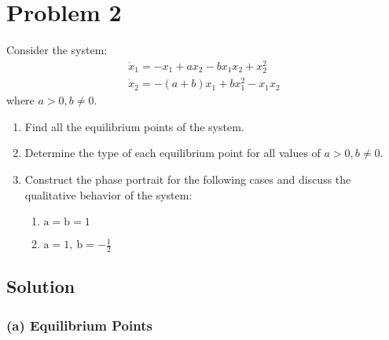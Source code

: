 \section*{Problem 2}

Consider the system:
\begin{equation*}
    \begin{gathered}
        \dot{x}_{1}=-x_{1}+a x_{2}-b x_{1} x_{2}+x_{2}^{2} \\
        \dot{x}_{2}=-(a+b) x_{1}+b x_{1}^{2}-x_{1} x_{2}
    \end{gathered}
\end{equation*}
where \( a>0, b \neq 0 \).

\begin{enumerate}[label= (\alph*)]
    \item Find all the equilibrium points of the system.
    \item Determine the type of each equilibrium point for all values of \( a>0, b \neq 0 \).
    \item Construct the phase portrait for the following cases and discuss the qualitative behavior of the system:
          \begin{enumerate}[label= (\roman*)]
              \item \( \mathrm{a}=\mathrm{b}=1 \)
              \item \( \mathrm{a}=1, \mathrm{~b}=-\frac{1}{2} \)
          \end{enumerate}
\end{enumerate}

\subsection*{Solution}

\subsubsection*{(a) Equilibrium Points}

